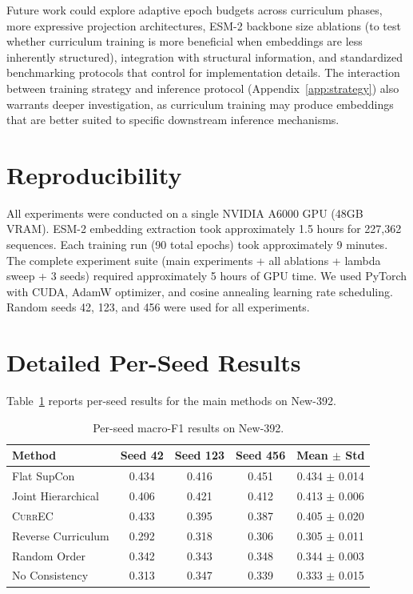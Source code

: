 \documentclass{article}
\newcommand{\currec}{\textsc{CurrEC}}
\begin{document}
Future work could explore adaptive epoch budgets across curriculum phases, more expressive projection architectures, ESM-2 backbone size ablations (to test whether curriculum training is more beneficial when embeddings are less inherently structured), integration with structural information, and standardized benchmarking protocols that control for implementation details. The interaction between training strategy and inference protocol (Appendix~\ref{app:strategy}) also warrants deeper investigation, as curriculum training may produce embeddings that are better suited to specific downstream inference mechanisms.

\section*{Reproducibility}

All experiments were conducted on a single NVIDIA A6000 GPU (48GB VRAM). ESM-2 embedding extraction took approximately 1.5 hours for 227{,}362 sequences. Each training run (90 total epochs) took approximately 9 minutes. The complete experiment suite (main experiments + all ablations + lambda sweep + 3 seeds) required approximately 5 hours of GPU time. We used PyTorch with CUDA, AdamW optimizer, and cosine annealing learning rate scheduling. Random seeds 42, 123, and 456 were used for all experiments.




\newpage
\appendix

\section{Detailed Per-Seed Results}\label{app:perSeed}

Table~\ref{tab:perseed} reports per-seed results for the main methods on New-392.

\begin{table}[h]
\caption{Per-seed macro-F1 results on New-392.}
\label{tab:perseed}
\centering
\begin{tabular}{lccc|c}
\toprule
Method & Seed 42 & Seed 123 & Seed 456 & Mean $\pm$ Std \\
\midrule
Flat SupCon & 0.434 & 0.416 & 0.451 & 0.434 $\pm$ 0.014 \\
Joint Hierarchical & 0.406 & 0.421 & 0.412 & 0.413 $\pm$ 0.006 \\
\currec{} & 0.433 & 0.395 & 0.387 & 0.405 $\pm$ 0.020 \\
Reverse Curriculum & 0.292 & 0.318 & 0.306 & 0.305 $\pm$ 0.011 \\
Random Order & 0.342 & 0.343 & 0.348 & 0.344 $\pm$ 0.003 \\
No Consistency & 0.313 & 0.347 & 0.339 & 0.333 $\pm$ 0.015 \\
\bottomrule
\end{tabular}
\end{table}
\end{document}
